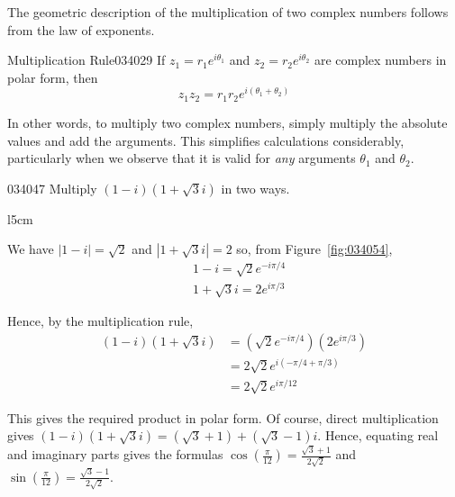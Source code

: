 The geometric description of the multiplication of two complex numbers follows from the law of exponents.


\begin{theorem}{Multiplication Rule}{034029}
If $z_{1} = r_{1}e^{i{\theta}_1}$ and $z_{2} = r_{2}e^{i{\theta}_2}$ are complex numbers in polar form, then
\begin{equation*}
z_1z_2 = r_1r_2e^{i (\theta_1 + \theta_2)}
\end{equation*}
\vspace*{-2em}
\end{theorem}

\noindent In other words, to multiply two complex
 numbers, simply multiply the absolute values and add the arguments. 
This simplifies calculations considerably, particularly when we observe 
that it is valid for \textit{any} arguments $\theta_{1}$ and $\theta_{2}$.


\begin{example}{}{034047}
Multiply $(1-i)(1+\sqrt{3}i)$ in two ways.


\begin{solution}
\begin{wrapfigure}[8]{l}{5cm}
	\centering
	
	\caption{\label{fig:034054}}
\end{wrapfigure}
	
\setlength{\rightskip}{0pt plus 200pt}
  We have $|1 - i| = \sqrt{2}$ and $|1 + \sqrt{3}i| = 2$ so, from Figure~\ref{fig:034054},
\begin{align*}
& 1-i = \sqrt{2} e^{-i\pi /4} \\
& 1+ \sqrt{3}i = 2e^{i\pi /3}
\end{align*}

Hence, by the multiplication rule,
\begin{align*}
(1-i)(1+\sqrt{3}i) &= (\sqrt{2} e^{-i\pi /4})(2e^{i\pi /3}) \\
&= 2\sqrt{2} e^{i(-\pi/4 + \pi/3)} \\
&= 2 \sqrt{2} e^{i\pi/12}
\end{align*}

This gives the required product in polar form. Of course, direct multiplication gives $(1 - i)(1 + \sqrt{3}i) = (\sqrt{3} + 1) + (\sqrt{3} - 1)i$. Hence, equating real and imaginary parts gives the formulas $\cos (\frac{\pi}{12}) = \frac{\sqrt{3}+1}{2\sqrt{2}}$ and $\sin (\frac{\pi}{12}) = \frac{\sqrt{3}-1}{2\sqrt{2}}$.
\end{solution}
\end{example}

